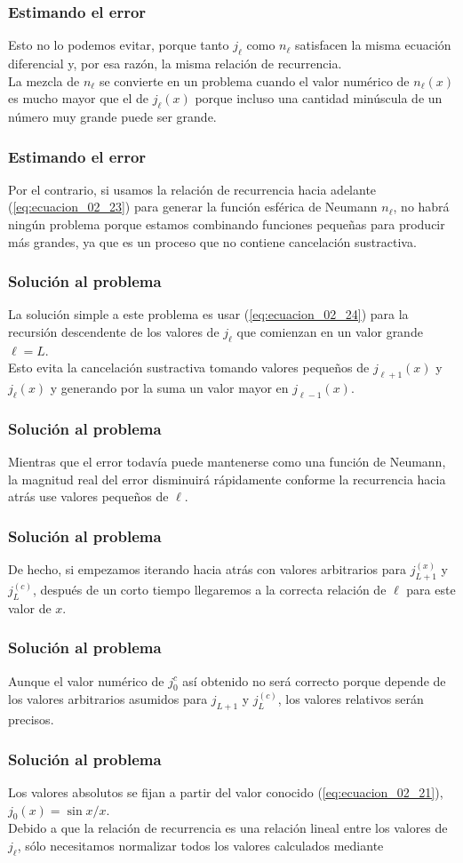 \begin{frame}
\frametitle{Estimando el error}
Esto no lo podemos evitar, porque tanto $j_{\ell}$ como $n_{\ell}$ satisfacen la misma ecuación diferencial y, por esa razón, la misma relación de recurrencia.
\\
\bigskip
La mezcla de $n_{\ell}$ se convierte en un problema cuando el valor numérico de $n_{\ell}(x)$ es mucho mayor que el de $j_{\ell} (x)$ porque incluso una cantidad minúscula de un número muy grande puede ser grande.
\end{frame}
\begin{frame}
\frametitle{Estimando el error}
Por el contrario, si usamos la relación de recurrencia hacia adelante (\ref{eq:ecuacion_02_23}) para generar la función esférica de Neumann $n_{\ell}$, no habrá ningún problema porque estamos combinando funciones pequeñas para producir más grandes, ya que es un proceso que no contiene cancelación sustractiva.
\end{frame}
\begin{frame}
\frametitle{Solución al problema}
La solución simple a este problema es usar (\ref{eq:ecuacion_02_24}) para la recursión descendente de los valores de $j_{\ell}$ que comienzan en un valor grande $\ell = L$.
\\
\bigskip
Esto evita la cancelación sustractiva tomando valores pequeños de $j_{\ell + 1} (x)$ y $j_{\ell}(x)$ y generando por la suma un valor mayor en $j_{\ell -1}(x)$.
\end{frame}
\begin{frame}
\frametitle{Solución al problema}
Mientras que el error todavía puede mantenerse como una función de Neumann, la magnitud real del error disminuirá rápidamente conforme la recurrencia hacia atrás use valores pequeños de $\ell$.
\end{frame}
\begin{frame}
\frametitle{Solución al problema}
De hecho, si empezamos iterando hacia atrás con valores arbitrarios para $j_{L + 1}^{(x)}$ y $j_{L}^{(c)}$, después de un corto tiempo llegaremos a la correcta relación de $\ell$ para este valor de $x$.
\end{frame}
\begin{frame}
\frametitle{Solución al problema}
Aunque el valor numérico de $j_{0}^{c}$ así obtenido no será correcto porque depende de los valores arbitrarios asumidos para $j_{L + 1}$ y $j_{L}^{(c)}$, los valores relativos serán precisos. 
\end{frame}
\begin{frame}
\frametitle{Solución al problema}
Los valores absolutos se fijan a partir del valor conocido (\ref{eq:ecuacion_02_21}), $j_{0} (x) = \sin x / x$.
\\
\bigskip
Debido a que la relación de recurrencia es una relación lineal entre los valores de $j_{\ell}$, sólo necesitamos normalizar todos los valores calculados mediante 
\end{frame}
